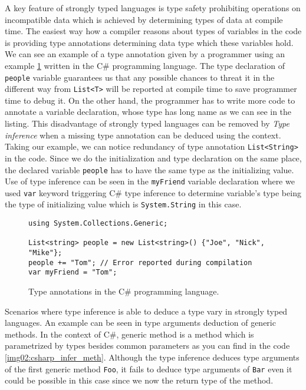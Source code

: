 A key feature of strongly typed languages is type safety prohibiting operations on incompatible data which is achieved by determining types of data at compile time.
The easiest way how a compiler reasons about types of variables in the code is providing type annotations determining data type which these variables hold.
We can see an example of a type annotation given by a programmer using an example \ref{img01:csharp_type_anot} written in the C\# programming language.
The type declaration of \texttt{people} variable guarantees us that any possible chances to threat it in the different way from \texttt{List<T>} will be reported at compile time to save programmer time to debug it.
On the other hand, the programmer has to write more code to annotate a variable declaration, whose type has long name as we can see in the listing.
This disadvantage of strongly typed languages can be removed by {\it Type inference} when a missing type annotation can be deduced using the context.
Taking our example, we can notice redundancy of type annotation \texttt{List<String>} in the code.
Since we do the initialization and type declaration on the same place, the declared variable \texttt{people} has to have the same type as the initializing value.
Use of type inference can be seen in the \texttt{myFriend} variable declaration where we used \texttt{var} keyword triggering C\# type inference to determine variable's type being the type of initializing value which is \texttt{System.String} in this case.
\par
\begin{figure}
\begin{lstlisting}
using System.Collections.Generic;

List<string> people = new List<string>() {"Joe", "Nick", "Mike"};
people += "Tom"; // Error reported during compilation
var myFriend = "Tom";
\end{lstlisting}
\caption{Type annotations in the C\# programming language.}
\label{img01:csharp_type_anot}
\end{figure}
\par
{}
Scenarios where type inference is able to deduce a type vary in strongly typed languages.
An example can be seen in type arguments deduction of generic methods.
In the context of C\#, generic method is a method which is parametrized by types besides common parameters as you can find in the code \ref{img02:csharp_infer_meth}.
Although the type inference deduces type arguments of the first generic method \texttt{Foo}, it fails to deduce type arguments of \texttt{Bar} even it could be possible in this case since we now the return type of the method.
